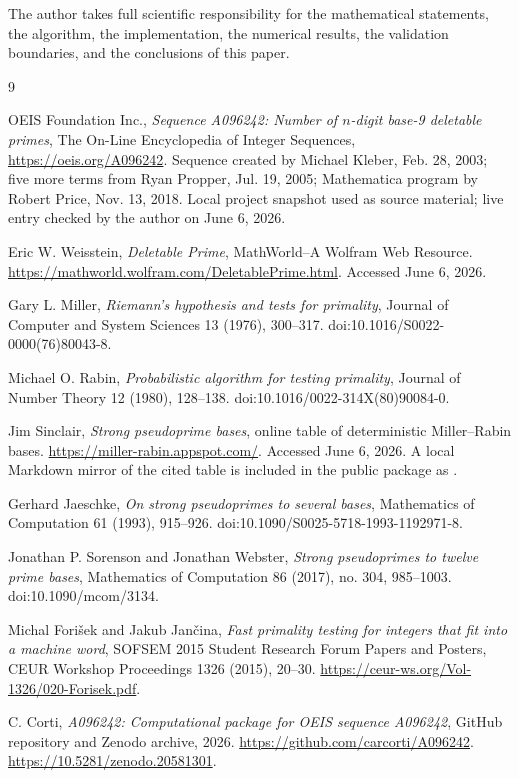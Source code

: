 \documentclass[11pt]{article}
\theoremstyle{definition}
\theoremstyle{remark}
\begin{document}
The author takes full scientific responsibility for the mathematical
statements, the algorithm, the implementation, the numerical results, the
validation boundaries, and the conclusions of this paper.

\begin{thebibliography}{9}
\sloppy
\raggedright

OEIS Foundation Inc.,
\emph{Sequence A096242: Number of \(n\)-digit base-9 deletable primes},
The On-Line Encyclopedia of Integer Sequences,
\url{https://oeis.org/A096242}.
Sequence created by Michael Kleber, Feb. 28, 2003; five more terms from
Ryan Propper, Jul. 19, 2005; Mathematica program by Robert Price,
Nov. 13, 2018.  Local project snapshot used as source material; live entry
checked by the author on June 6, 2026.

Eric W. Weisstein,
\emph{Deletable Prime},
MathWorld--A Wolfram Web Resource.
\url{https://mathworld.wolfram.com/DeletablePrime.html}.
Accessed June 6, 2026.

Gary L. Miller,
\emph{Riemann's hypothesis and tests for primality},
Journal of Computer and System Sciences 13 (1976), 300--317.
doi:10.1016/S0022-0000(76)80043-8.

Michael O. Rabin,
\emph{Probabilistic algorithm for testing primality},
Journal of Number Theory 12 (1980), 128--138.
doi:10.1016/0022-314X(80)90084-0.

Jim Sinclair,
\emph{Strong pseudoprime bases},
online table of deterministic Miller--Rabin bases.
\url{https://miller-rabin.appspot.com/}.
Accessed June 6, 2026.  A local Markdown mirror of the cited table is
included in the public package as
.

Gerhard Jaeschke,
\emph{On strong pseudoprimes to several bases},
Mathematics of Computation 61 (1993), 915--926.
doi:10.1090/S0025-5718-1993-1192971-8.

Jonathan P. Sorenson and Jonathan Webster,
\emph{Strong pseudoprimes to twelve prime bases},
Mathematics of Computation 86 (2017), no. 304, 985--1003.
doi:10.1090/mcom/3134.

Michal Fori\v{s}ek and Jakub Jan\v{c}ina,
\emph{Fast primality testing for integers that fit into a machine word},
SOFSEM 2015 Student Research Forum Papers and Posters, CEUR Workshop
Proceedings 1326 (2015), 20--30.
\url{https://ceur-ws.org/Vol-1326/020-Forisek.pdf}.

C. Corti,
\emph{A096242: Computational package for OEIS sequence A096242},
GitHub repository and Zenodo archive, 2026.
\url{https://github.com/carcorti/A096242}.
\url{https://10.5281/zenodo.20581301}.

\end{thebibliography}
\end{document}
